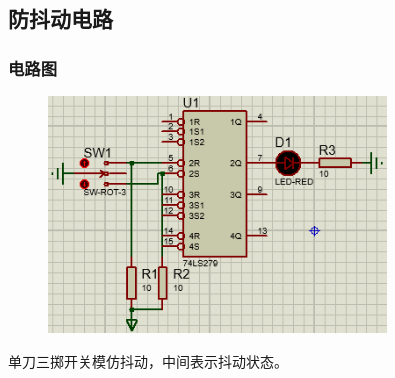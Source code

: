 \documentclass[UTF8, a4paper, 11pt]{article}
\begin{document}
\subsection{防抖动电路}
\subsubsection{电路图}
\begin{figure}[H]
    \centering
    \includegraphics[width=0.8\textwidth]{ex9.5电路图.png}
\end{figure}
单刀三掷开关模仿抖动，中间表示抖动状态。
\end{document}
